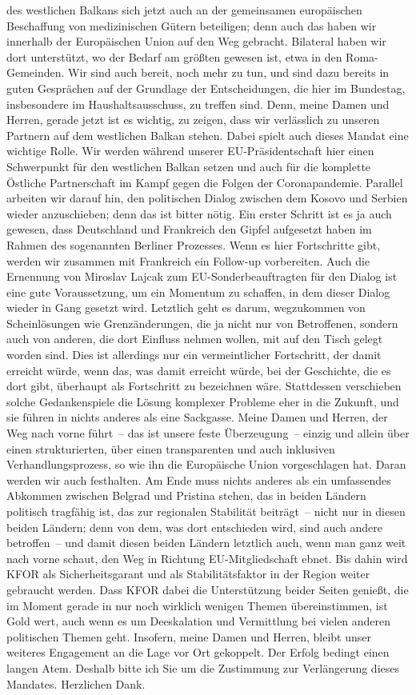 \documentclass{article}
\begin{document}
des westlichen Balkans sich jetzt auch an der gemeinsamen europäischen Beschaffung von medizinischen Gütern beteiligen; denn auch das haben wir innerhalb der Europäischen Union auf den Weg gebracht. Bilateral haben wir dort unterstützt, wo der Bedarf am größten gewesen ist, etwa in den Roma-Gemeinden. Wir sind auch bereit, noch mehr zu tun, und sind dazu bereits in guten Gesprächen auf der Grundlage der Entscheidungen, die hier im Bundestag, insbesondere im Haushaltsausschuss, zu treffen sind. Denn, meine Damen und Herren, gerade jetzt ist es wichtig, zu zeigen, dass wir verlässlich zu unseren Partnern auf dem westlichen Balkan stehen. Dabei spielt auch dieses Mandat eine wichtige Rolle. Wir werden während unserer EU-Präsidentschaft hier einen Schwerpunkt für den westlichen Balkan setzen und auch für die komplette Östliche Partnerschaft im Kampf gegen die Folgen der Coronapandemie. Parallel arbeiten wir darauf hin, den politischen Dialog zwischen dem Kosovo und Serbien wieder anzuschieben; denn das ist bitter nötig. Ein erster Schritt ist es ja auch gewesen, dass Deutschland und Frankreich den Gipfel aufgesetzt haben im Rahmen des sogenannten Berliner Prozesses. Wenn es hier Fortschritte gibt, werden wir zusammen mit Frankreich ein Follow-up vorbereiten. Auch die Ernennung von Miroslav Lajcak zum EU-Sonderbeauftragten für den Dialog ist eine gute Voraussetzung, um ein Momentum zu schaffen, in dem dieser Dialog wieder in Gang gesetzt wird. Letztlich geht es darum, wegzukommen von Scheinlösungen wie Grenzänderungen, die ja nicht nur von Betroffenen, sondern auch von anderen, die dort Einfluss nehmen wollen, mit auf den Tisch gelegt worden sind. Dies ist allerdings nur ein vermeintlicher Fortschritt, der damit erreicht würde, wenn das, was damit erreicht würde, bei der Geschichte, die es dort gibt, überhaupt als Fortschritt zu bezeichnen wäre. Stattdessen verschieben solche Gedankenspiele die Lösung komplexer Probleme eher in die Zukunft, und sie führen in nichts anderes als eine Sackgasse.  Meine Damen und Herren, der Weg nach vorne führt – das ist unsere feste Überzeugung – einzig und allein über einen strukturierten, über einen transparenten und auch inklusiven Verhandlungsprozess, so wie ihn die Europäische Union vorgeschlagen hat. Daran werden wir auch festhalten. Am Ende muss nichts anderes als ein umfassendes Abkommen zwischen Belgrad und Pristina stehen, das in beiden Ländern politisch tragfähig ist, das zur regionalen Stabilität beiträgt – nicht nur in diesen beiden Ländern; denn von dem, was dort entschieden wird, sind auch andere betroffen – und damit diesen beiden Ländern letztlich auch, wenn man ganz weit nach vorne schaut, den Weg in Richtung EU-Mitgliedschaft ebnet. Bis dahin wird KFOR als Sicherheitsgarant und als Stabilitätsfaktor in der Region weiter gebraucht werden. Dass KFOR dabei die Unterstützung beider Seiten genießt, die im Moment gerade in nur noch wirklich wenigen Themen übereinstimmen, ist Gold wert, auch wenn es um Deeskalation und Vermittlung bei vielen anderen politischen Themen geht. Insofern, meine Damen und Herren, bleibt unser weiteres Engagement an die Lage vor Ort gekoppelt. Der Erfolg bedingt einen langen Atem. Deshalb bitte ich Sie um die Zustimmung zur Verlängerung dieses Mandates. Herzlichen Dank.  
\end{document}
